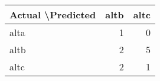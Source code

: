 \begin{tabular}{lrr}
\toprule
Actual \textbackslash   Predicted &  altb &  altc \\
\midrule
               alta &     1 &     0 \\
               altb &     2 &     5 \\
               altc &     2 &     1 \\
\bottomrule
\end{tabular}
